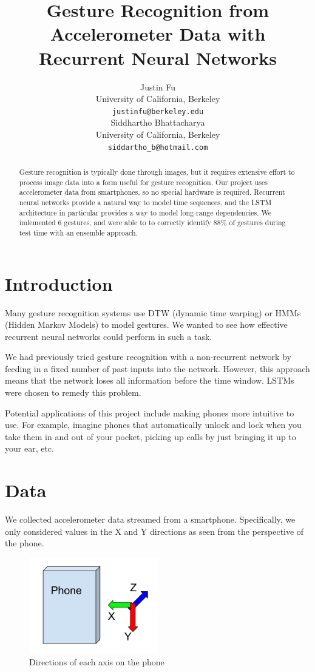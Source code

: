 \documentclass[11pt]{article}
\title{Gesture Recognition from Accelerometer Data with Recurrent Neural Networks}
\author{Justin Fu \\
  University of California, Berkeley\\
  {\tt justinfu@berkeley.edu} \\\And
  Siddhartho Bhattacharya \\
  University of California, Berkeley\\
  {\tt siddartho\_b@hotmail.com} \\}
\date{}
\begin{document}
\maketitle 
\begin{abstract}
  Gesture recognition is typically done through images, but it requires
  extensive effort to process image data into a form useful for gesture
  recognition. Our project uses accelerometer data from smartphones,
  so no special hardware is required.
  Recurrent neural networks provide a natural way to model time
  sequences, and the LSTM architecture in particular provides a way
  to model long-range dependencies. We imlemented 6 gestures, and were able to
  to correctly identify 88\% of gestures during test time with
  an ensemble approach.
\end{abstract}

\section{Introduction}

Many gesture recognition systems use DTW (dynamic time
warping) or HMMs (Hidden Markov Models) to model gestures.
We wanted to see how effective recurrent neural networks
could perform in such a task.

We had previously tried gesture recognition with a
non-recurrent network by feeding in a fixed number of
past inputs into the network. However, this approach
means that the network loses all information before
the time window. LSTMs were chosen to remedy this problem.

Potential applications of this project include making
phones more intuitive to use. For example, imagine 
phones that automatically unlock and lock when you take 
them in and out of your pocket, picking up calls by just
bringing it up to your ear, etc.

\section{Data}

We collected accelerometer data streamed from a smartphone.
Specifically, we only considered values in the X and Y directions
as seen from the perspective of the phone. 

\begin{figure}[ht]
\caption{Directions of each axis on the phone}
  \centering
    \includegraphics[width=0.5\textwidth]{phone_axis}
\end{figure}
\end{document}
